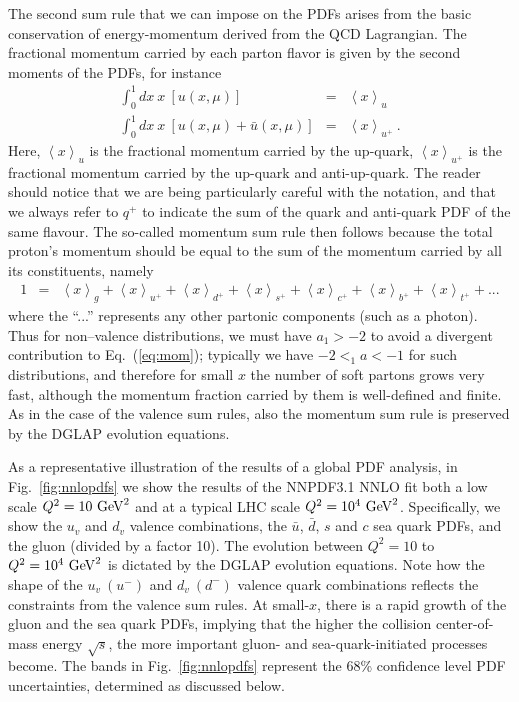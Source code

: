 The second sum rule that we can impose on the PDFs arises
from the basic conservation of energy-momentum derived from
the QCD Lagrangian.
%
The fractional momentum carried
by each parton flavor is given by the second moments of the PDFs, for instance
%
\begin{eqnarray}
\int_{0}^{1}dx\ x\ \left[u(x,\mu)\right] & = & \left\langle x\right\rangle _{u}\\
\int_{0}^{1}dx\ x\ \left[u(x,\mu)+\bar{u}(x,\mu)\right] & = & \left\langle x\right\rangle _{u^{+}}\ .
\end{eqnarray}
%
Here, $\left\langle x\right\rangle _{u}$ is the fractional momentum
carried by the up-quark, $\left\langle x\right\rangle _{u^{+}}$ is
the fractional momentum carried by the up-quark and anti-up-quark.
%
The reader should notice that we are being particularly careful
with the notation, and that we always refer to $q^+$ to indicate
the sum of the quark and anti-quark PDF of the same flavour.
%
The so-called momentum sum rule then follows because the total
proton's momentum should be equal to the sum of the momentum
carried by all its constituents, namely
\begin{eqnarray}\label{eq:mom}
1 & = & \left\langle x\right\rangle _{g}+\left\langle x\right\rangle _{u^{+}}+\left\langle x\right\rangle _{d^{+}}+\left\langle x\right\rangle _{s^{+}}+\left\langle x\right\rangle _{c^{+}}+\left\langle x\right\rangle _{b^{+}}+\left\langle x\right\rangle _{t^{+}}+...
\end{eqnarray}
%
where the ``...'' represents any other partonic components (such
as a photon). Thus for non--valence distributions, we must have $a_1>-2$ to avoid a divergent contribution to
Eq.~(\ref{eq:mom}); typically we have $-2<_1a<-1$ for such distributions, and therefore for small $x$ the number of soft partons
grows very fast, although the momentum fraction carried by them is well-defined
and finite.
%
As in the case of the valence sum rules, also the momentum
sum rule is preserved by the DGLAP evolution equations.

As a representative illustration of the results of a global
PDF analysis, in Fig.~\ref{fig:nnlopdfs} we show
the results of the NNPDF3.1 NNLO fit both  a low scale
    $Q^2=10~{\rm GeV}^2$  and at a typical LHC scale
    $Q^2=10^4~{\rm GeV}^2$.
    Specifically, we show the  $u_v$ and $d_v$ valence combinations, the $\bar{u}$,
    $\bar{d}$, $s$ and $c$ sea quark PDFs, and the gluon (divided by a factor 10).
    The evolution between $Q^2=10$ to $Q^2=10^4~{\rm GeV}^2$ is dictated
    by the DGLAP evolution equations.
    Note how the shape of the $u_v~(u^{-})$ and $d_v~(d^{-})$ valence quark combinations
    reflects the constraints from the valence sum rules.
    At small-$x$, there is a rapid growth of the gluon and the sea quark PDFs, implying
    that the higher the collision center-of-mass energy $\sqrt{s}$, the more
    important gluon- and sea-quark-initiated processes become.
    The bands in Fig.~\ref{fig:nnlopdfs} represent the 68\% confidence level
    PDF uncertainties, determined as discussed below.

